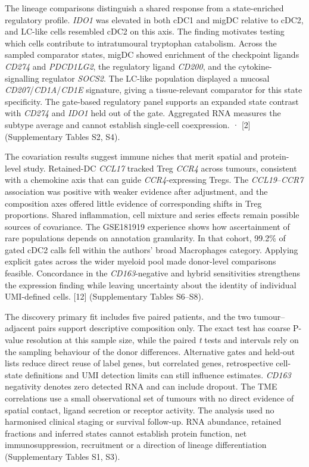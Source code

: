 \documentclass[11pt,a4paper]{article}
\begin{document}
The lineage comparisons distinguish a shared response from a state-enriched regulatory profile. \textit{IDO1} was elevated in both cDC1 and migDC relative to cDC2, and LC-like cells resembled cDC2 on this axis. The finding motivates testing which cells contribute to intratumoural tryptophan catabolism. Across the sampled comparator states, migDC showed enrichment of the checkpoint ligands \textit{CD274} and \textit{PDCD1LG2}, the regulatory ligand \textit{CD200}, and the cytokine-signalling regulator \textit{SOCS2}. The LC-like population displayed a mucosal \textit{CD207}/\textit{CD1A}/\textit{CD1E} signature, giving a tissue-relevant comparator for this state specificity. The gate-based regulatory panel supports an expanded state contrast with \textit{CD274} and \textit{IDO1} held out of the gate. Aggregated RNA measures the subtype average and cannot establish single-cell coexpression. · [2] (Supplementary Tables S2, S4).

The covariation results suggest immune niches that merit spatial and protein-level study. Retained-DC \textit{CCL17} tracked Treg \textit{CCR4} across tumours, consistent with a chemokine axis that can guide \textit{CCR4}-expressing Tregs. The \textit{CCL19}--\textit{CCR7} association was positive with weaker evidence after adjustment, and the composition axes offered little evidence of corresponding shifts in Treg proportions. Shared inflammation, cell mixture and series effects remain possible sources of covariance. The GSE181919 experience shows how ascertainment of rare populations depends on annotation granularity. In that cohort, 99.2\% of gated cDC2 calls fell within the authors' broad Macrophages category. Applying explicit gates across the wider myeloid pool made donor-level comparisons feasible. Concordance in the \textit{CD163}-negative and hybrid sensitivities strengthens the expression finding while leaving uncertainty about the identity of individual UMI-defined cells. [12] (Supplementary Tables S6--S8).

The discovery primary fit includes five paired patients, and the two tumour--adjacent pairs support descriptive composition only. The exact test has coarse P-value resolution at this sample size, while the paired \textit{t} tests and intervals rely on the sampling behaviour of the donor differences. Alternative gates and held-out lists reduce direct reuse of label genes, but correlated genes, retrospective cell-state definitions and UMI detection limits can still influence estimates. \textit{CD163} negativity denotes zero detected RNA and can include dropout. The TME correlations use a small observational set of tumours with no direct evidence of spatial contact, ligand secretion or receptor activity. The analysis used no harmonised clinical staging or survival follow-up. RNA abundance, retained fractions and inferred states cannot establish protein function, net immunosuppression, recruitment or a direction of lineage differentiation (Supplementary Tables S1, S3).
\end{document}
